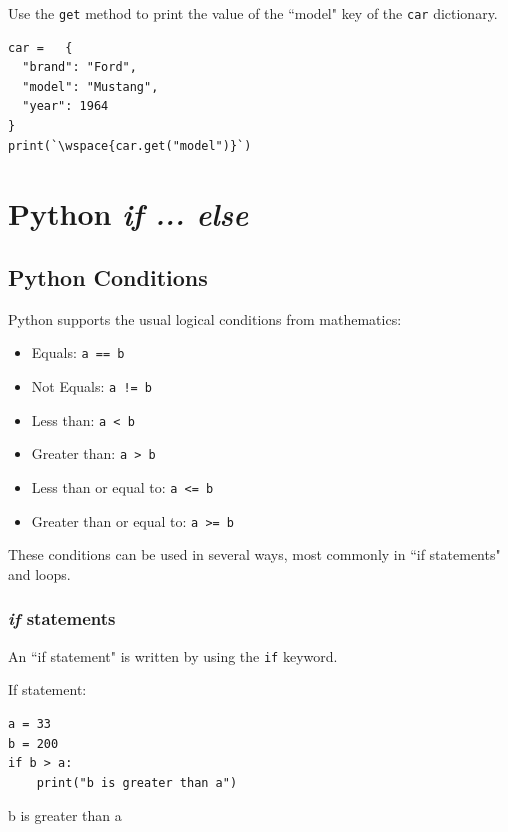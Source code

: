 \documentclass[12pt,a4paper]{article}
\newcommand{\wspace}[1]{%
	\color{white}\colorbox{white}{\texttt{#1}}%
}
\newcommand{\code}[1]{%
	\colorbox{backcolour}{\lstinline{#1}}%
}
\newcommand{\lcode}[1]{%
	\lstinline{#1}%
}
\begin{document}
\begin{tbox}
Use the \lcode{get} method to print the value of the ``model" key of the
\lcode{car} dictionary.
	\begin{lstlisting}
car =	{
  "brand": "Ford",
  "model": "Mustang",
  "year": 1964
}
print(`\wspace{car.get("model")}`)
	\end{lstlisting}
\end{tbox}
\vfill\newpage
\section{Python \textit{if ... else}}\label{pyIfStatement}

\subsection{Python Conditions}

Python supports the usual logical conditions from mathematics:

\begin{multicols}{2}
\begin{itemize}
	\item Equals: \code{a == b}
	\item Not Equals: \code{a != b}
	\item Less than: \code{a < b}
	\item Greater than: \code{a > b}
	\item Less than or equal to: \code{a <= b}
	\item Greater than or equal to: \code{a >= b}
\end{itemize}
\end{multicols}

These conditions can be used in several ways, most commonly in ``if statements" and loops.

\subsubsection{\textit{if} statements}

An ``if statement" is written by using the \code{if} keyword.

\begin{ebox}
If statement:
	\begin{lstlisting}
a = 33
b = 200
if b > a:
    print("b is greater than a")
	\end{lstlisting}
\tcblower
	\begin{vercode}
b is greater than a
	\end{vercode}
\end{ebox}
\end{document}
